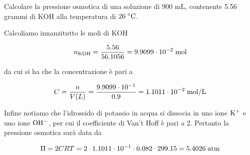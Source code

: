 \begin{esercizio}
    Calcolare la pressione osmotica di una soluzione di 900 mL, contenente 5.56 grammi di KOH alla temperatura di $26 \; ^{\circ} \rm C$.
\end{esercizio}
\begin{soluzione}
    Calcoliamo innanzitutto le moli di KOH

$$n_{\rm KOH}=\frac{5.56}{56.1056}
=9.9099 \cdot 10^{-2} \; \rm mol$$

da cui si ha che la concentrazione è pari a

$$C=\frac{n}{V(L)}
=\frac{9.9099 \cdot 10^{-1}}{0.9}
=1.1011 \cdot 10^{-2} \; \rm mol/L$$

Infine notiamo che l'idrossido di potassio in acqua si dissocia in uno ione $\rm K^+$ e uno ione $\rm OH^-$, per cui il coefficiente di Van't Hoff è pari a 2. Pertanto la pressione osmotica sarà data da

$$\Pi=2CRT
=2 \cdot 1.1011 \cdot 10^{-1} \cdot 0.082 \cdot 299.15
=5.4026 \; \rm atm$$
\end{soluzione}

\newpage

